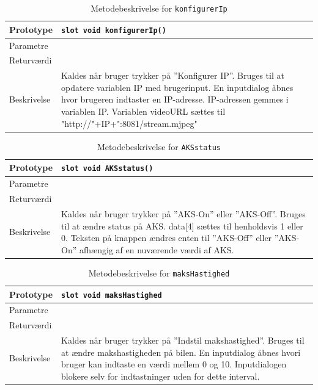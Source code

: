 \begin{table}[H]
\begin{tabularx}{\textwidth}{| L{2.5 cm} | Z |} \hline
Prototype & \texttt{slot void konfigurerIp()} \\\hline
Parametre &   \\\hline
Returværdi &  \\\hline
Beskrivelse & Kaldes når bruger trykker på ''Konfigurer IP''. Bruges til at opdatere variablen IP med brugerinput. En inputdialog åbnes hvor brugeren indtaster en IP-adresse. IP-adressen gemmes i variablen IP. Variablen videoURL sættes til "http://"+IP+":8081/stream.mjpeg" \\\hline
\end{tabularx}
\caption{Metodebeskrivelse for \texttt{konfigurerIp}}
\label{table:met_konfigurerIp}
\end{table}

\begin{table}[H]
\begin{tabularx}{\textwidth}{| L{2.5 cm} | Z |} \hline
Prototype & \texttt{slot void AKSstatus()} \\\hline
Parametre &   \\\hline
Returværdi &  \\\hline
Beskrivelse & Kaldes når bruger trykker på ''AKS-On'' eller ''AKS-Off''. Bruges til at ændre status på AKS. data[4] sættes til henholdsvis 1 eller 0. Teksten på knappen ændres enten til ''AKS-Off'' eller ''AKS-On'' afhængig af en nuværende værdi af AKS. \\\hline
\end{tabularx}
\caption{Metodebeskrivelse for \texttt{AKSstatus}}
\label{table:met_AKSstatus}
\end{table}

\begin{table}[H]
\begin{tabularx}{\textwidth}{| L{2.5 cm} | Z |} \hline
Prototype & \texttt{slot void maksHastighed} \\\hline
Parametre &   \\\hline
Returværdi &  \\\hline
Beskrivelse & Kaldes når bruger trykker på ''Indstil makshastighed''. Bruges til at ændre makshastigheden på bilen. En inputdialog åbnes hvori bruger kan indtaste en værdi mellem 0 og 10. Inputdialogen blokere selv for indtastninger uden for dette interval.  \\\hline
\end{tabularx}
\caption{Metodebeskrivelse for \texttt{maksHastighed}}
\label{table:met_maksHastighed}
\end{table}

